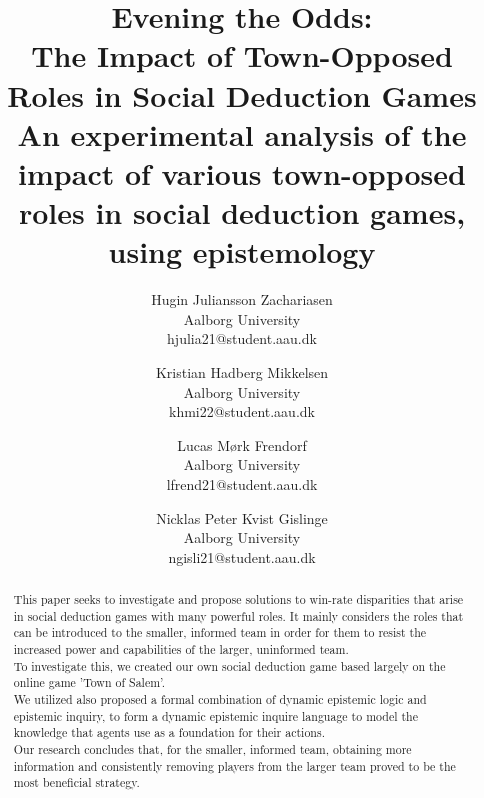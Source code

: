 \documentclass[twocolumn]{article}
\begin{document}

\title{Evening the Odds:\\ The Impact of Town-Opposed Roles in Social Deduction 
Games\\ \small An experimental analysis of the impact of various 
town-opposed roles in social deduction games, using epistemology}
\author{
	Hugin Juliansson Zachariasen \\ Aalborg University \\ hjulia21@student.aau.dk
	\and
	Kristian Hadberg Mikkelsen \\ Aalborg University \\ khmi22@student.aau.dk
	\and
	Lucas Mørk Frendorf \\ Aalborg University \\ lfrend21@student.aau.dk
	\and
	Nicklas Peter Kvist Gislinge \\ Aalborg University \\ ngisli21@student.aau.dk
}
\maketitle
\begin{abstract}
This paper seeks to investigate and propose solutions to win-rate disparities that arise in social deduction games with many powerful roles. It mainly considers the roles that can be introduced to the smaller, informed team in order for them to resist the increased power and capabilities of the larger, uninformed team.\\ 
To investigate this, we created our own social deduction game based largely on the online game 'Town of Salem'.\\ 
We utilized also proposed a formal combination of dynamic epistemic logic and epistemic inquiry, to form a dynamic epistemic inquire language to model the knowledge that agents use as a foundation for their actions.\\ 
Our research concludes that, for the smaller, informed team, obtaining more information and consistently removing players from the larger team proved to be the most beneficial strategy.
\end{abstract}











\clearpage
\appendix
\makeatletter
\def\@seccntformat#1{\appendixname\ \csname the#1\endcsname: }
\makeatother




\clearpage
\printbibliography[heading=bibintoc, title=Bibliography]
\label{bib:mybiblio}
\end{document}
